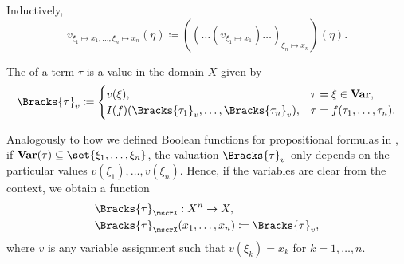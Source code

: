 \begin{definition}
\begin{thmenum}
    Inductively,
    \begin{equation*}
      v_{\xi_1 \mapsto x_1, \ldots, \xi_n \mapsto x_n}(\eta) \coloneqq ((\ldots(v_{\xi_1 \mapsto x_1})\ldots)_{\xi_n \mapsto x_n})(\eta).
    \end{equation*}

     The  of a term \( \tau \) is a value in the domain \( X \) given by
    \begin{equation}\label{eq:def:first_order_valuation/term_valuation}
      \Bracks{\tau}_v \coloneqq \begin{cases}
        v(\xi),                                             &\tau = \xi \in \boldop{Var}, \\
        I(f)(\Bracks{\tau_1}_v, \ldots, \Bracks{\tau_n}_v), &\tau = f(\tau_1, \ldots, \tau_n).
      \end{cases}
    \end{equation}

     Analogously to how we defined Boolean functions for propositional formulas in , if \( \boldop{Var}(\tau) \subseteq \set{ \xi_1, \ldots, \xi_n } \), the valuation \( \Bracks{\tau}_v \) only depends on the particular values \( v(\xi_1), \ldots, v(\xi_n) \). Hence, if the variables are clear from the context, we obtain a function
    \begin{equation*}
      \begin{aligned}
        &\Bracks{\tau}_\mscrX: X^n \to X, \\
        &\Bracks{\tau}_\mscrX(x_1, \ldots, x_n) \coloneqq \Bracks{\tau}_v,
      \end{aligned}
    \end{equation*}
    where \( v \) is any variable assignment such that \( v(\xi_k) = x_k \) for \( k = 1, \ldots, n \).


\end{thmenum}
\end{definition}

